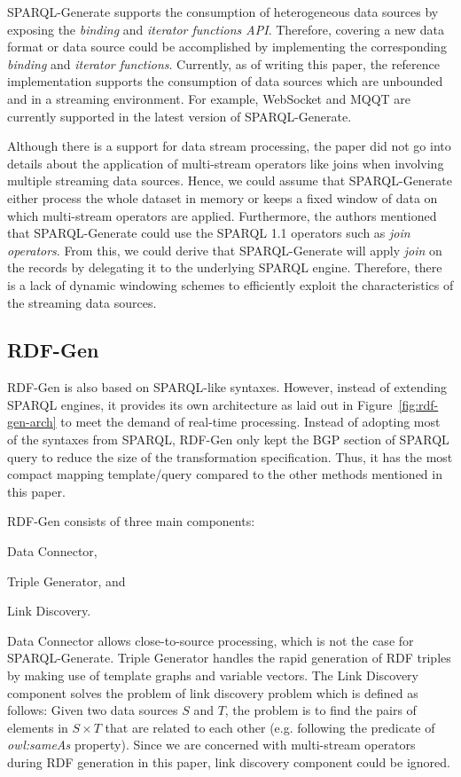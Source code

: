 SPARQL-Generate supports the consumption of heterogeneous data sources by exposing the 
\emph{binding} and \emph{iterator functions API}. Therefore, covering a new data format or data source could be accomplished 
by implementing the corresponding \emph{binding} and \emph{iterator functions}. Currently, as of writing this paper, 
the reference implementation supports the consumption of data sources which are unbounded and in a streaming environment. 
For example, WebSocket and MQQT are currently supported in the latest version of SPARQL-Generate. 

Although there is a support for data stream processing, the paper did not go into details 
about the application of multi-stream operators like joins when involving multiple streaming 
data sources. Hence, we could assume that SPARQL-Generate either process the whole dataset in memory or 
keeps a fixed window of data on which multi-stream operators are applied. Furthermore, the 
authors mentioned that SPARQL-Generate could use the SPARQL 1.1 operators such as \emph{join operators}. 
From this, we could derive that SPARQL-Generate will apply \emph{join} on the 
records by delegating it to the underlying SPARQL engine. 
Therefore, there is a lack of  
dynamic windowing schemes to efficiently exploit the characteristics of the streaming data sources.  

\subsection{RDF-Gen}
RDF-Gen\cite{rdf_gen} is also based on SPARQL-like syntaxes. However, instead of extending SPARQL engines, 
it provides its own architecture as laid out in Figure~\ref{fig:rdf-gen-arch} to meet the demand
of real-time processing. Instead of adopting most of the syntaxes from SPARQL, RDF-Gen only 
kept the BGP section of SPARQL query to reduce the size of the transformation specification. 
Thus, it has the most compact mapping template/query compared to the other methods mentioned in this paper. 

RDF-Gen consists of three main components: 
\begin{enumerate*}[label=(\alph*)]
  \item Data Connector,
  \item Triple Generator, and
  \item Link Discovery.
\end{enumerate*}
Data Connector allows close-to-source processing, which is not the case for SPARQL-Generate. 
Triple Generator handles the rapid generation of RDF triples by making use of 
template graphs and variable vectors. The Link Discovery component solves the 
problem of link discovery problem which is defined as follows:
Given two data sources $S$ and $T$, the problem is to find the pairs of elements in 
$S \times T$ that are related to each other (e.g. following the predicate of 
\emph{owl:sameAs} property). Since we are concerned with 
multi-stream operators during RDF generation in this paper, link discovery component could be ignored. 


